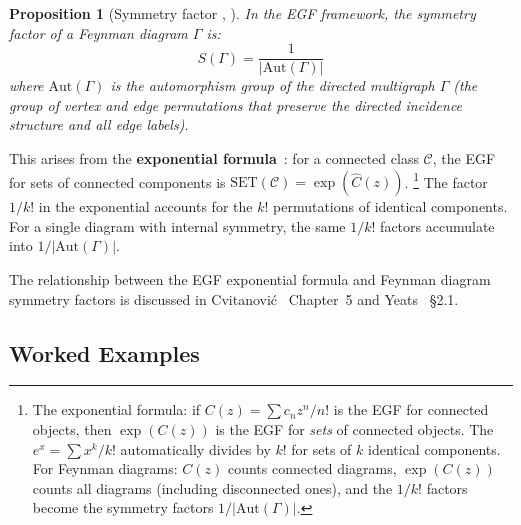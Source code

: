 \documentclass[11pt,a4paper]{article}
\newtheorem{proposition}[theorem]{Proposition}
\theoremstyle{definition}
\newcommand{\Aut}{\mathrm{Aut}}
\newcommand{\SET}{\mathrm{SET}}
\begin{document}
\begin{proposition}[Symmetry factor {\cite[II.2.2]{flajolet2009}, \cite[\S5.4]{cvitanovic2008}}]
\label{prop:symmetry}
In the EGF framework, the symmetry factor of a Feynman diagram $\Gamma$ is:
\begin{equation}
S(\Gamma) = \frac{1}{|\Aut(\Gamma)|}
\end{equation}
where $\Aut(\Gamma)$ is the automorphism group of the directed multigraph
$\Gamma$ (the group of vertex and edge permutations that preserve the
directed incidence structure and all edge labels).
\end{proposition}

This arises from the \textbf{exponential formula}~\cite{flajolet2009}:
for a connected class $\mathcal{C}$, the EGF for sets of connected
components is $\SET(\mathcal{C}) = \exp(\hat{C}(z))$.%
\footnote{The exponential formula: if $C(z) = \sum c_n z^n/n!$ is the
EGF for connected objects, then $\exp(C(z))$ is the EGF for \emph{sets}
of connected objects. The $e^x = \sum x^k/k!$ automatically divides by
$k!$ for sets of $k$ identical components. For Feynman diagrams:
$C(z)$ counts connected diagrams, $\exp(C(z))$ counts all diagrams
(including disconnected ones), and the $1/k!$ factors become the
symmetry factors $1/|\Aut(\Gamma)|$.}
The factor $1/k!$
in the exponential accounts for the $k!$ permutations of identical
components. For a single diagram with internal symmetry, the same
$1/k!$ factors accumulate into $1/|\Aut(\Gamma)|$.

The relationship between the EGF exponential formula and Feynman diagram
symmetry factors is discussed in Cvitanovi\'{c}~\cite{cvitanovic2008}
Chapter~5 and Yeats~\cite{yeats2017} \S2.1.

\subsection{Worked Examples}
\end{document}
